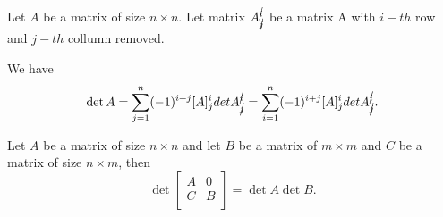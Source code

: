 \documentclass[main.tex]{subfiles}
\begin{document}
\begin{definition}
Let $A$ be a matrix of size $n\times n$. Let matrix $A^{\cancel{i}}_{\cancel{j}}$ be a matrix A with $i-th$ row and $j-th$ collumn removed.
\end{definition}

We have
\begin{equation}
\det A = \sum_{j=1}^n (-1)^{i + j} [A]^i_j det A^{\cancel{i}}_{\cancel{j}} = \sum_{i=1}^n (-1)^{i + j} [A]^i_j det A^{\cancel{i}}_{\cancel{j}}.
\end{equation}

\begin{theorem}
\label{det-0}
Let $A$ be a matrix of size $n\times n$ and let $B$ be a matrix of $m\times m$ and $C$ be a matrix of size $n\times m$, then
\begin{equation}
\det \begin{bmatrix}
    A &  0 \\
    C & B \\
\end{bmatrix} = \det A\det B.
\end{equation}
\end{theorem}
\end{document}

